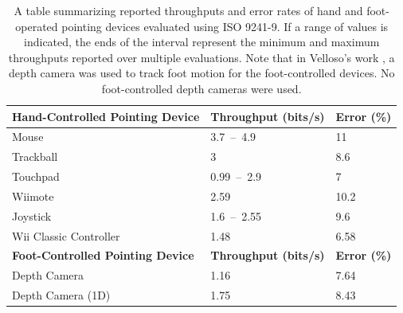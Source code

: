 \documentclass [12pt,letterpaper]{report}
\begin{document}
\begin{table}[]
\centering
\caption{A table summarizing reported throughputs and error rates of hand and foot-operated pointing devices evaluated using ISO 9241-9. If a range of values is indicated, the ends of the interval represent the minimum and maximum throughputs reported over multiple evaluations. Note that in Velloso's work \cite{velloso2015interactions}, a depth camera was used to track foot motion for the foot-controlled devices. No foot-controlled depth cameras were used.}
\label{ISO_comparison}
\begin{tabular}{@{}l|ll@{}}
\toprule
\textbf{Hand-Controlled Pointing Device}          & \textbf{Throughput (bits/s)} & \textbf{Error (\%)} \\ \midrule
Mouse \cite{soukoreff2004towards}                 & 3.7~--~4.9                   & 11                \\
Trackball \cite{soukoreff2004towards}             & 3                            & 8.6               \\
Touchpad \cite{soukoreff2004towards}              & 0.99~--~2.9                  & 7                 \\
Wiimote \cite{natapov2009iso}                     & 2.59                         & 10.2              \\
Joystick \cite{soukoreff2004towards}              & 1.6~--~2.55                  & 9.6               \\
Wii Classic Controller \cite{natapov2009iso} 	  & 1.48                         & 6.58              \\ \midrule
\textbf{Foot-Controlled Pointing Device}          & \textbf{Throughput (bits/s)} & \textbf{Error (\%)} \\ \midrule
Depth Camera \cite{velloso2015interactions}      & 1.16                         & 7.64              \\
Depth Camera (1D) \cite{velloso2015interactions} & 1.75                         & 8.43              \\ \bottomrule
\end{tabular}
\end{table}
\end{document}
